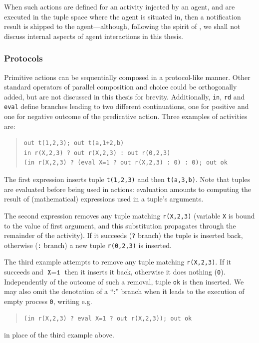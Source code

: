 \documentclass[12pt,a4paper,twoside,openright]{book}
\begin{document}
When such actions are defined for an activity injected by an agent, and are executed in the tuple space where the agent is situated in, then a notification result is shipped to the agent---although, following the spirit of \cite{zavattaro}, we shall not discuss internal aspects of agent interactions in this thesis.

\subsubsection*{Protocols}

Primitive actions can be sequentially composed in a protocol-like manner.
%
Other standard operators of parallel composition and choice could be orthogonally added, but are not discussed in this thesis for brevity.
%
Additionally, \texttt{in}, \texttt{rd} and \texttt{eval} define branches leading to two different continuations, one for positive and one for negative outcome of the predicative action.
%
Three examples of activities are:

{\codefont\begin{quote} 
\begin{verbatim}
out t(1,2,3); out t(a,1+2,b)
in r(X,2,3) ? out r(X,2,3) : out r(0,2,3)
(in r(X,2,3) ? (eval X=1 ? out r(X,2,3) : 0) : 0); out ok
\end{verbatim}\end{quote}
}

\noindent The first expression inserts tuple \texttt{t(1,2,3)} and then \texttt{t(a,3,b)}.
%
Note that tuples are evaluated before being used in actions: evaluation amounts to computing the result of (mathematical) expressions used in a tuple's arguments.

The second expression removes any tuple matching \texttt{r(X,2,3)} (variable \texttt{X} is bound to the value of first argument, and this substitution propagates through the remainder of the activity).
%
If it succeeds (\texttt{?} branch) the tuple is inserted back, otherwise (\texttt{:} branch) a new tuple \texttt{r(0,2,3)} is inserted.

The third example attempts to remove any tuple matching \texttt{r(X,2,3)}.
%
If it succeeds and $\texttt{X}=\texttt{1}$ then it inserts it back, otherwise it does nothing (\texttt{0}).
%
Independently of the outcome of such a removal, tuple \texttt{ok} is then inserted.
%
We may also omit the denotation of a ``:'' branch when it leads to the execution of empty process \texttt{0}, writing e.g.
{\begin{quote}
\begin{verbatim}
(in r(X,2,3) ? eval X=1 ? out r(X,2,3)); out ok
\end{verbatim}\end{quote}
}
\noindent
in place of the third example above.
\end{document}
